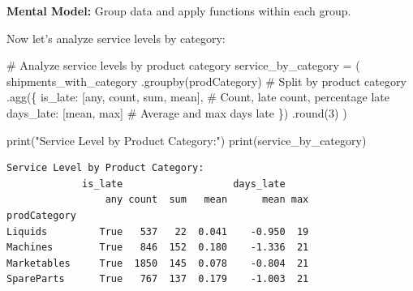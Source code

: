 \documentclass[
]{article}
\newenvironment{Shaded}{\begin{snugshade}}{\end{snugshade}}
\newcommand{\BuiltInTok}[1]{\textcolor[rgb]{0.00,0.23,0.31}{#1}}
\newcommand{\CommentTok}[1]{\textcolor[rgb]{0.37,0.37,0.37}{#1}}
\newcommand{\DecValTok}[1]{\textcolor[rgb]{0.68,0.00,0.00}{#1}}
\newcommand{\NormalTok}[1]{\textcolor[rgb]{0.00,0.23,0.31}{#1}}
\newcommand{\OperatorTok}[1]{\textcolor[rgb]{0.37,0.37,0.37}{#1}}
\newcommand{\StringTok}[1]{\textcolor[rgb]{0.13,0.47,0.30}{#1}}
\begin{document}
\textbf{Mental Model:} Group data and apply functions within each group.

Now let's analyze service levels by category:

\label{mental-model-7-groupby}
\begin{Shaded}
\begin{Highlighting}[]
\CommentTok{\# Analyze service levels by product category}
\NormalTok{service\_by\_category }\OperatorTok{=}\NormalTok{ (}
\NormalTok{    shipments\_with\_category}
\NormalTok{    .groupby(}\StringTok{\textquotesingle{}prodCategory\textquotesingle{}}\NormalTok{)  }\CommentTok{\# Split by product category}
\NormalTok{    .agg(\{}
        \StringTok{\textquotesingle{}is\_late\textquotesingle{}}\NormalTok{: [}\StringTok{\textquotesingle{}any\textquotesingle{}}\NormalTok{, }\StringTok{\textquotesingle{}count\textquotesingle{}}\NormalTok{, }\StringTok{\textquotesingle{}sum\textquotesingle{}}\NormalTok{, }\StringTok{\textquotesingle{}mean\textquotesingle{}}\NormalTok{],  }\CommentTok{\# Count, late count, percentage late}
        \StringTok{\textquotesingle{}days\_late\textquotesingle{}}\NormalTok{: [}\StringTok{\textquotesingle{}mean\textquotesingle{}}\NormalTok{, }\StringTok{\textquotesingle{}max\textquotesingle{}}\NormalTok{]  }\CommentTok{\# Average and max days late}
\NormalTok{    \})}
\NormalTok{    .}\BuiltInTok{round}\NormalTok{(}\DecValTok{3}\NormalTok{)}
\NormalTok{)}

\BuiltInTok{print}\NormalTok{(}\StringTok{"Service Level by Product Category:"}\NormalTok{)}
\BuiltInTok{print}\NormalTok{(service\_by\_category)}
\end{Highlighting}
\end{Shaded}

\begin{verbatim}
Service Level by Product Category:
             is_late                   days_late    
                 any count  sum   mean      mean max
prodCategory                                        
Liquids         True   537   22  0.041    -0.950  19
Machines        True   846  152  0.180    -1.336  21
Marketables     True  1850  145  0.078    -0.804  21
SpareParts      True   767  137  0.179    -1.003  21
\end{verbatim}
\end{document}
